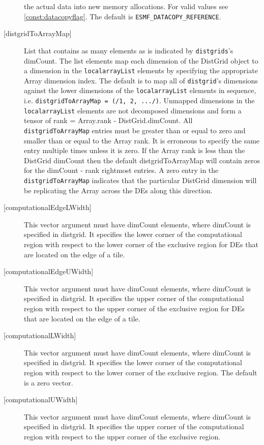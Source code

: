 \begin{description}
   the actual data into new memory allocations. For valid values see
   \ref{const:datacopyflag}. The default is {\tt ESMF\_DATACOPY\_REFERENCE}.
   \item[{[distgridToArrayMap]}]
   List that contains as many elements as is indicated by
   {\tt distgrids}'s dimCount. The list elements map each dimension of
   the DistGrid object to a dimension in the {\tt localarrayList} elements
   by specifying the appropriate Array dimension index. The default is
   to map all of {\tt distgrid}'s dimensions against the lower dimensions
   of the {\tt localarrayList} elements in sequence, i.e.
   {\tt distgridToArrayMap = (/1, 2, .../)}.
   Unmapped dimensions in the {\tt localarrayList} elements are not
   decomposed dimensions and form a tensor of
   rank = Array.rank - DistGrid.dimCount.
   All {\tt distgridToArrayMap} entries must be greater than or equal
   to zero and smaller than or equal to the Array rank. It is erroneous
   to specify the same entry multiple times unless it is zero.
   If the Array rank is less than the DistGrid dimCount then the default
   distgridToArrayMap will contain zeros for the dimCount - rank
   rightmost entries. A zero entry in the {\tt distgridToArrayMap}
   indicates that the particular DistGrid dimension will be replicating
   the Array across the DEs along this direction.
   \item[{[computationalEdgeLWidth]}]
   This vector argument must have dimCount elements, where dimCount is
   specified in distgrid. It specifies the lower corner of the computational
   region with respect to the lower corner of the exclusive region for DEs
   that are located on the edge of a tile.
   \item[{[computationalEdgeUWidth]}]
   This vector argument must have dimCount elements, where dimCount is
   specified in distgrid. It specifies the upper corner of the computational
   region with respect to the upper corner of the exclusive region for DEs
   that are located on the edge of a tile.
   \item[{[computationalLWidth]}]
   This vector argument must have dimCount elements, where dimCount is
   specified in distgrid. It specifies the lower corner of the computational
   region with respect to the lower corner of the exclusive region.
   The default is a zero vector.
   \item[{[computationalUWidth]}]
   This vector argument must have dimCount elements, where dimCount is
   specified in distgrid. It specifies the upper corner of the computational
   region with respect to the upper corner of the exclusive region.

\end{description}
